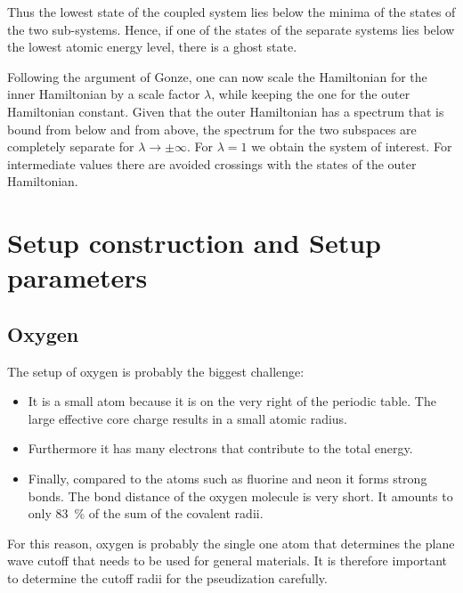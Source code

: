 \documentclass[11pt,a4paper]{report}
\begin{document}
Thus the lowest state of the coupled system lies below the minima of
the states of the two sub-systems. Hence, if one of the states of the
separate systems lies below the lowest atomic energy level, there
is a ghost state. 

Following the argument of Gonze\cite{gonze91_prb44_8503}, one can now
scale the Hamiltonian for the inner Hamiltonian by a scale factor
$\lambda$, while keeping the one for the outer Hamiltonian
constant. Given that the outer Hamiltonian has a spectrum that is
bound from below and from above, the spectrum for the two subspaces
are completely separate for $\lambda\rightarrow\pm\infty$.  For
$\lambda=1$ we obtain the system of interest. For intermediate values
there are avoided crossings with the states of the outer Hamiltonian. 




\chapter{Setup construction and Setup parameters}
\section{Oxygen}
The setup of oxygen is probably the biggest challenge:
\begin{itemize}
\item It is a small atom because it is on the very right of the
  periodic table. The large effective core charge results in a small
  atomic radius. 
\item Furthermore it has many electrons that contribute to
  the total energy. 
\item Finally, compared to the atoms such as fluorine and neon it
  forms strong bonds. The bond distance of the oxygen molecule is very
  short. It amounts to only 83~\% of the sum of the covalent radii.
\end{itemize}
For this reason, oxygen is probably the single one atom that
determines the plane wave cutoff that needs to be used for general
materials.  It is therefore important to determine the cutoff radii
for the pseudization carefully. 

\end{document}
